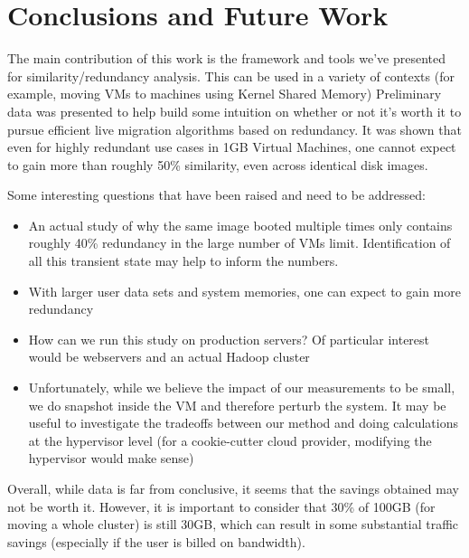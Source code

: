 \documentclass{acm_proc_article-sp}
\begin{document}
\section{Conclusions and Future Work}
The main contribution of this work is the framework and tools we've presented for similarity/redundancy analysis.  This can be used in a variety of contexts (for example, moving VMs to machines using Kernel Shared Memory) Preliminary data was presented to help build some intuition on whether or not it's worth it to pursue efficient live migration algorithms based on redundancy.  It was shown that even for highly redundant use cases in 1GB Virtual Machines, one cannot expect to gain more than roughly 50\% similarity, even across identical disk images.

Some interesting questions that have been raised and need to be addressed:
\begin{itemize}
  \item An actual study of why the same image booted multiple times only contains roughly 40\% redundancy in the large number of VMs limit.  Identification of all this transient state may help to inform the numbers.   
  \item With larger user data sets and system memories, one can expect to gain more redundancy
  \item How can we run this study on production servers? Of particular interest would be webservers and an actual Hadoop cluster
  \item Unfortunately, while we believe the impact of our measurements to be small, we do snapshot inside the VM and therefore perturb the system.  It may be useful to investigate the tradeoffs between our method and doing calculations at the hypervisor level (for a cookie-cutter cloud provider, modifying the hypervisor would make sense)
\end{itemize}

Overall, while data is far from conclusive, it seems that the savings obtained may not be worth it.  However, it is important to consider that 30\% of 100GB (for moving a whole cluster) is still 30GB, which can result in some substantial traffic savings (especially if the user is billed on bandwidth).




\end{document}
